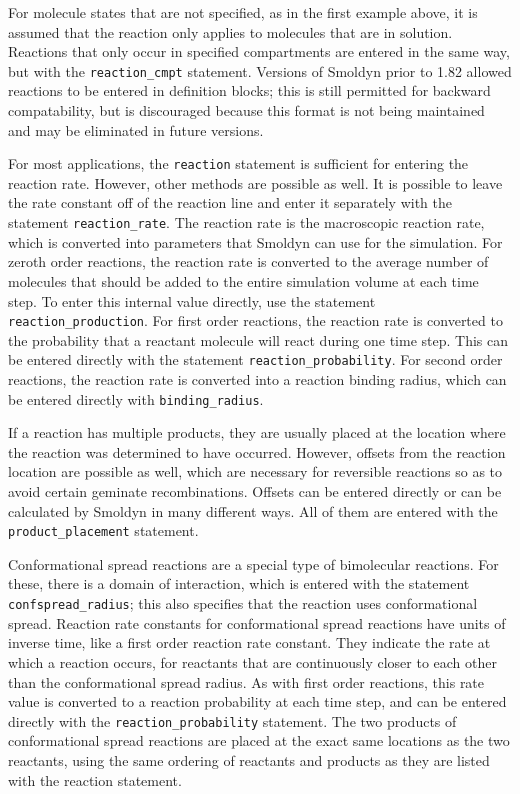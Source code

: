 \documentclass {scrbook}
\newcommand {\ttt} {\texttt}
\begin{document}
For molecule states that are not specified, as in the first example above, it is assumed that the reaction only applies to molecules that are in solution. Reactions that only occur in specified compartments are entered in the same way, but with the \ttt{reaction\_cmpt} statement. Versions of Smoldyn prior to 1.82 allowed reactions to be entered in definition blocks; this is still permitted for backward compatability, but is discouraged because this format is not being maintained and may be eliminated in future versions.

For most applications, the \ttt{reaction} statement is sufficient for entering the reaction rate. However, other methods are possible as well. It is possible to leave the rate constant off of the reaction line and enter it separately with the statement \ttt{reaction\_rate}. The reaction rate is the macroscopic reaction rate, which is converted into parameters that Smoldyn can use for the simulation. For zeroth order reactions, the reaction rate is converted to the average number of molecules that should be added to the entire simulation volume at each time step. To enter this internal value directly, use the statement \ttt{reaction\_production}. For first order reactions, the reaction rate is converted to the probability that a reactant molecule will react during one time step. This can be entered directly with the statement \ttt{reaction\_probability}. For second order reactions, the reaction rate is converted into a reaction binding radius, which can be entered directly with \ttt{binding\_radius}.

If a reaction has multiple products, they are usually placed at the location where the reaction was determined to have occurred. However, offsets from the reaction location are possible as well, which are necessary for reversible reactions so as to avoid certain geminate recombinations. Offsets can be entered directly or can be calculated by Smoldyn in many different ways. All of them are entered with the \ttt{product\_placement} statement.

Conformational spread reactions are a special type of bimolecular reactions. For these, there is a domain of interaction, which is entered with the statement \ttt{confspread\_radius}; this also specifies that the reaction uses conformational spread. Reaction rate constants for conformational spread reactions have units of inverse time, like a first order reaction rate constant. They indicate the rate at which a reaction occurs, for reactants that are continuously closer to each other than the conformational spread radius. As with first order reactions, this rate value is converted to a reaction probability at each time step, and can be entered directly with the \ttt{reaction\_probability} statement. The two products of conformational spread reactions are placed at the exact same locations as the two reactants, using the same ordering of reactants and products as they are listed with the reaction statement.
\end{document}
